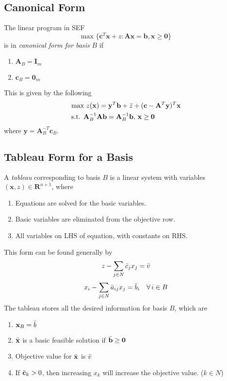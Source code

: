 \subsection{Canonical Form}
The linear program in SEF
\begin{equation*}
    \text{max } \{\mathbf{c}^T\mathbf{x} + z : \mathbf{Ax} = \mathbf{b}, \mathbf{x} \geq \mathbf{0} \}
\end{equation*}
is in \emph{canonical form for basis} $B$ if
\begin{enumerate}
    \item $\mathbf{A}_B = \mathbf{I}_m$
    \item $\mathbf{c}_B = \mathbf{0}_m$
\end{enumerate}
This is given by the following
\begin{align*}
    & \text{max } z(\mathbf{x}) = \mathbf{y}^T\mathbf{b} + \Bar{z} + (\mathbf{c} - \mathbf{A}^T\mathbf{y})^T\mathbf{x} \\
    & \text{s.t. }\mathbf{A}_B^{-1} \mathbf{A} \mathbf{b} = \mathbf{A}_B^{-1} \mathbf{b},\, \mathbf{x \geq 0}
\end{align*}
where $\mathbf{y}=\mathbf{A}_B^{-T}\mathbf{c}_B$.


\subsection{Tableau Form for a Basis}
A \emph{tableau} corresponding to basis $B$ is a linear system with variables $(\mathbf{x}, z)\in \mathbf{R}^{n+1}$, where
\begin{enumerate}
    \item Equations are solved for the basic variables.
    \item Basic variables are eliminated from the objective row.
    \item All variables on LHS of equation, with constants on RHS.
\end{enumerate}
This form can be found generally by
\begin{equation*}
    z - \sum_{j\in N} \Bar{c}_j x_j = \Bar{v}
\end{equation*}
\begin{equation*}
    x_i - \sum_{j\in N} \Bar{a}_{ij} x_j = \Bar{b}_i \quad \forall \, i \in B
\end{equation*}
The tableau stores all the desired information for basis $B$, which are
\begin{enumerate}
    \item $\mathbf{x}_B = \Bar{b}$
    \item $\Bar{\mathbf{x}}$ is a basic feasible solution if $\Bar{\mathbf{b}}\geq \mathbf{0}$
    \item Objective value for $\Bar{\mathbf{x}}$ is $\Bar{v}$
    \item If $\Bar{\mathbf{c}}_k > 0$, then increasing $x_k$ will increase the objective value. ($k\in N$)
\end{enumerate}

